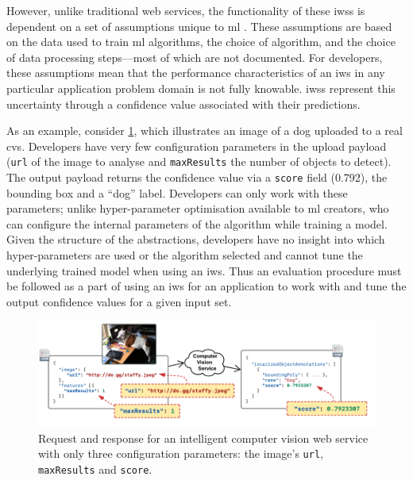 However, unlike traditional web services, the functionality of these \glspl{iws} is dependent on a set of assumptions unique to \gls{ml} \citep{Cummaudo:2019icsme}. These assumptions are based on the data used to train \gls{ml} algorithms, the choice of algorithm, and the choice of data processing steps---most of which are not documented. For developers, these assumptions mean that the performance characteristics of an \gls{iws} in any particular application problem domain is not fully knowable. \Glspl{iws} represent this uncertainty through a confidence value associated with their predictions. 

As an example, consider \cref{fig:dog-example}, which illustrates an image of a dog uploaded to a real \gls{cvs}. Developers have very few configuration parameters in the upload payload (\texttt{url} of the image to analyse and \texttt{maxResults} the number of objects to detect). The  output payload returns the confidence value via a \texttt{score} field (0.792), the bounding box and a ``dog'' label. Developers can only work with these parameters; unlike hyper-parameter optimisation available to \gls{ml} creators, who can configure the internal parameters of the algorithm while training a model. Given the structure of the abstractions, developers have no insight into which hyper-parameters are used or the algorithm selected and cannot tune the underlying trained model when using an \gls{iws}. %
Thus an evaluation procedure must be followed as a part of using an \gls{iws} for an application to work with and tune the output confidence values for a given input set.


\begin{figure}[t]
    \includegraphics[width=\linewidth]{dog-example.pdf}
    \caption{Request and response for an intelligent computer vision web service with only three configuration parameters: the image's \texttt{url}, \texttt{maxResults} and \texttt{score}.}
    \label{fig:dog-example}
\end{figure}

